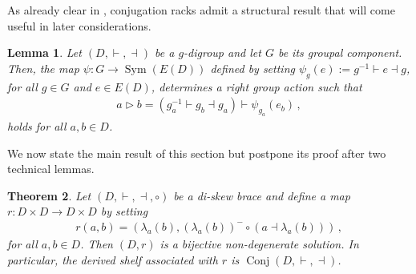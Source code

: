 \documentclass[preprint,1p]{elsarticle}
\numberwithin{equation}{section}
\newtheorem{theor}{Theorem}[section]
\newtheorem{lemma}[theor]{Lemma}
\theoremstyle{definition}               %
\newcommand{\vd}{\vdash}
\newcommand{\dv}{\dashv}
\newcommand{\tr}{\triangleright}
\DeclareMathOperator{\Sym}{Sym}
\DeclareMathOperator{\Conj}{Conj}
\begin{document}
As already clear in \cite{Res24}, conjugation racks admit a structural result that will come useful in later considerations.

\begin{lemma}\label{lemma:conj_rack_decomp}
    Let $(D,\vd,\dv)$ be a $g$-digroup and let $G$ be its groupal component.
    Then, the map $\psi:G \to \Sym(E(D))$ defined by setting $\psi_g(e) := g^{-1} \vd e \dv g$, for all $g \in G$ and $e \in E(D)$, determines a right group action such that
    \begin{align*}
        a \tr b = (g_a^{-1} \vd g_b \dv g_a) \vd \psi_{g_a}(e_b) \,,
    \end{align*}
    holds for all $a,b \in D$.
\end{lemma}

\medskip

We now state the main result of this section but postpone its proof after two technical lemmas.

\begin{theor}\label{theor:diskew_sol}
    Let $(D,\vd,\dv,\circ)$ be a di-skew brace and define a map $r:D \times D \to D \times D$ by setting
    \begin{align*}
        r(a,b) = (\lambda_a(b),(\lambda_a(b))^- \circ (a \dv \lambda_a(b))) \,,
    \end{align*}
    for all $a,b \in D$.
    Then $(D,r)$ is a bijective non-degenerate solution.
    In particular, the derived shelf associated with $r$ is $\Conj(D,\vd,\dv)$.
\end{theor}

\medskip
\end{document}
